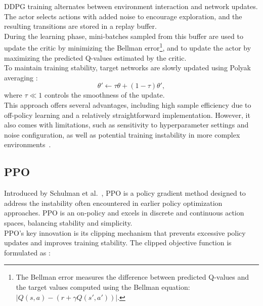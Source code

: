 \noindent \gls{DDPG} training alternates between environment interaction and network updates. The actor selects actions with added noise to encourage exploration, and the resulting transitions are stored in a replay buffer.\\

\noindent During the learning phase, mini-batches sampled from this buffer are used to update the critic by minimizing the Bellman error\footnote{The Bellman error measures the difference between predicted Q-values and the target values computed using the Bellman equation: $|Q(s,a) - (r + \gamma Q(s',a'))|$.}, and to update the actor by maximizing the predicted Q-values estimated by the critic.\\

\noindent To maintain training stability, target networks are slowly updated using Polyak averaging \cite{lillicrap2019continuouscontroldeepreinforcement}:
\begin{equation}
\theta' \leftarrow \tau \theta + (1 - \tau) \theta',
\end{equation}
\noindent where \(\tau \ll 1\) controls the smoothness of the update.\\

\noindent This approach offers several advantages, including high sample efficiency due to off-policy learning and a relatively straightforward implementation. However, it also comes with limitations, such as sensitivity to hyperparameter settings and noise configuration, as well as potential training instability in more complex environments~\cite{lillicrap2019continuouscontroldeepreinforcement}.


\subsection{\gls{PPO}}

Introduced by Schulman et al.~\cite{schulman2017proximalpolicyoptimizationalgorithms}, \gls{PPO} is a policy gradient method designed to address the instability often encountered in earlier policy optimization approaches. \gls{PPO} is an on-policy and excels in discrete and continuous action spaces, balancing stability and simplicity.\\

\noindent \gls{PPO}'s key innovation is its clipping mechanism that prevents excessive policy updates and improves training stability. The clipped objective function is formulated as \cite{schulman2017proximalpolicyoptimizationalgorithms}:

